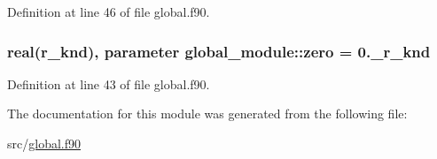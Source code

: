 Definition at line 46 of file global.\-f90.

\hypertarget{classglobal__module_aee835b3a70993d265b7592f2485da98a}{
\subsubsection[{zero}]{\setlength{\rightskip}{0pt plus 5cm}real({\bf r\-\_\-knd}), parameter global\-\_\-module\-::zero = 0.\-\_\-r\-\_\-knd}}\label{classglobal__module_aee835b3a70993d265b7592f2485da98a}


Definition at line 43 of file global.\-f90.



The documentation for this module was generated from the following file\-:\begin{DoxyCompactItemize}
\item 
src/\hyperlink{global_8f90}{global.\-f90}\end{DoxyCompactItemize}
